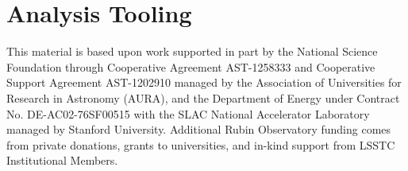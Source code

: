 \documentclass[twocolumn,longbib]{aastex7}
\begin{document}









\section{Analysis Tooling}
\label{sec:analysis}








\begin{acknowledgments}
This material is based upon work supported in part by the National Science Foundation through Cooperative Agreement AST-1258333 and Cooperative Support Agreement AST-1202910 managed by the Association of Universities for Research in Astronomy (AURA), and the Department of Energy under Contract No. DE-AC02-76SF00515 with the SLAC National Accelerator Laboratory managed by Stanford University.
Additional Rubin Observatory funding comes from private donations, grants to universities, and in-kind support from LSSTC Institutional Members.
\end{acknowledgments}




\end{document}

